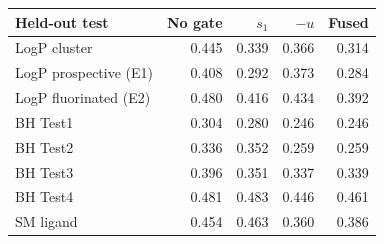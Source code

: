 \begin{tabular}{@{}lrrrr@{}}
\toprule
Held-out test & No gate & $s_1$ & $-u$ & Fused \\
\midrule
LogP cluster & 0.445 & 0.339 & 0.366 & 0.314 \\
LogP prospective (E1) & 0.408 & 0.292 & 0.373 & 0.284 \\
LogP fluorinated (E2) & 0.480 & 0.416 & 0.434 & 0.392 \\
BH Test1 & 0.304 & 0.280 & 0.246 & 0.246 \\
BH Test2 & 0.336 & 0.352 & 0.259 & 0.259 \\
BH Test3 & 0.396 & 0.351 & 0.337 & 0.339 \\
BH Test4 & 0.481 & 0.483 & 0.446 & 0.461 \\
SM ligand & 0.454 & 0.463 & 0.360 & 0.386 \\
\bottomrule
\end{tabular}